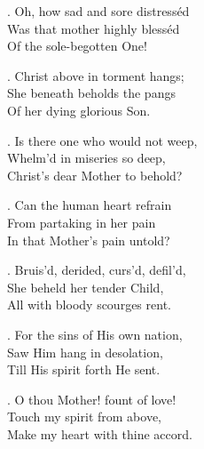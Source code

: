 {{. Oh, how sad and sore distress\'ed\\
Was that mother highly bless\'ed\\
Of the sole-begotten One!

. Christ above in torment hangs;\\
She beneath beholds the pangs\\
Of her dying glorious Son.

. Is there one who would not weep,\\
Whelm'd in miseries so deep,\\
Christ's dear Mother to behold?

. Can the human heart refrain\\
From partaking in her pain\\
In that Mother's pain untold?

. Bruis'd, derided, curs'd, defil'd,\\
She beheld her tender Child,\\
All with bloody scourges rent.

. For the sins of His own nation,\\
Saw Him hang in desolation,\\
Till His spirit forth He sent.

. O thou Mother! fount of love!\\
Touch my spirit from above,\\
Make my heart with thine accord.

}

}

\medskip

